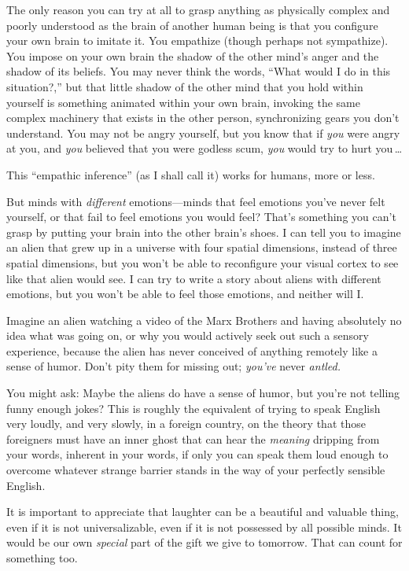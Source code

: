 {{
 The only reason you can try at all to grasp anything as physically
complex and poorly understood as the brain of another human being is
that you configure your own brain to imitate it. You empathize (though
perhaps not sympathize). You impose on your own brain the shadow of the
other mind's anger and the shadow of its beliefs. You
may never think the words, ``What would I do in this
situation?,'' but that little shadow of the other
mind that you hold within yourself is something animated within your
own brain, invoking the same complex machinery that exists in the other
person, synchronizing gears you don't understand. You
may not be angry yourself, but you know that if \textit{you} were angry
at you, and \textit{you} believed that you were godless scum,
\textit{you} would try to hurt you\,\ldots}

{
 This ``empathic inference'' (as
I shall call it) works for humans, more or less.}

{
 But minds with \textit{different} emotions---minds that feel
emotions you've never felt yourself, or that fail to
feel emotions you would feel? That's something you
can't grasp by putting your brain into the other
brain's shoes. I can tell you to imagine an alien that
grew up in a universe with four spatial dimensions, instead of three
spatial dimensions, but you won't be able to
reconfigure your visual cortex to see like that alien would see. I can
try to write a story about aliens with different emotions, but you
won't be able to feel those emotions, and neither will
I.}

{
 Imagine an alien watching a video of the Marx Brothers and having
absolutely no idea what was going on, or why you would actively seek
out such a sensory experience, because the alien has never conceived of
anything remotely like a sense of humor. Don't pity
them for missing out; \textit{you've} never
\textit{antled.}}

{
 You might ask: Maybe the aliens do have a sense of humor, but
you're not telling funny enough jokes? This is roughly
the equivalent of trying to speak English very loudly, and very slowly,
in a foreign country, on the theory that those foreigners must have an
inner ghost that can hear the \textit{meaning} dripping from your
words, inherent in your words, if only you can speak them loud enough
to overcome whatever strange barrier stands in the way of your
perfectly sensible English.}

{
 It is important to appreciate that laughter can be a beautiful and
valuable thing, even if it is not universalizable, even if it is not
possessed by all possible minds. It would be our own \textit{special}
part of the gift we give to tomorrow. That can count for something
too.}

}
